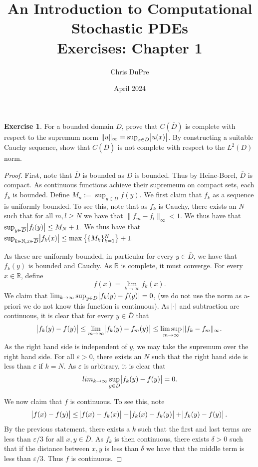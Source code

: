 \documentclass{amsart}
\title{An Introduction to Computational Stochastic PDEs\\ Exercises: Chapter 1}
\author{Chris DuPre }
\date{April 2024}
\theoremstyle{plain}
\theoremstyle{definition}
\newtheorem{exer}{Exercise}[section]
\newcommand{\R}{\mathbb{R}}
\newcommand{\N}{\mathbb{N}}
\begin{document}
\maketitle
\setcounter{section}{1}
\begin{exer}
For a bounded domain $D$, prove that $C\left(\overline{D}\right)$ is complete with respect to the supremum
norm $\|u\|_{\infty} = \sup_{x \in D} \abs{u(x)}$. By constructing a suitable Cauchy sequence, show that
$C\left(\overline{D}\right)$ is not complete with respect to the $L^{2}(D)$ norm. 
\end{exer}
\begin{proof}
    First, note that $\overline{D}$ is bounded as $D$ is bounded. Thus by Heine-Borel, $\overline{D}$ is compact. As continuous functions achieve their supremeum on compact sets, each $f_k$ is bounded. Define $M_n := \sup_{y\in \overline{D}} f(y)$. We first claim that $f_k$ as a sequence is uniformly bounded. To see this, note that as $f_k$ is Cauchy, there exists an $N$ such that for all $m,l\geq N$ we have that $\|f_m-f_l\|_{\infty} < 1.$ We thus have that $\sup_{y\in \overline{D}} \abs{f_l(y)} \leq M_N + 1.$ We thus have that $\sup_{k\in \N, x\in \overline{D}}\abs{f_k(x)} \leq \max\left\{\{M_k\}_{k=1}^{N}\right\}+1.$
    \par 
    As these are uniformly bounded, in particular for every $y\in \overline{D}$, we have that $f_k(y)$ is bounded and Cauchy. As $\R$ is complete, it must converge. For every $x\in \R$, define
    $$f(x) = \lim_{k\to \infty} f_k(x).$$
    We claim that $\lim_{k\to \infty} \sup_{y\in D} \abs{f_k(y)-f(y)} = 0$, (we do not use the norm as a-priori we do not know this function is continuous). As $\abs{\cdot}$ and subtraction are continuous, it is clear that for every $y \in \overline{D}$ that
    $$\abs{f_{k}(y)-f(y)} \leq\lim_{m\to \infty}\abs{f_{k}(y)-f_{m}(y)} \leq \limsup_{m\to \infty} \|f_k -f_m\|_{\infty}.$$
    As the right hand side is independent of $y$, we may take the supremum over the right hand side. For all $\varepsilon > 0$, there exists an $N$ such that the right hand side is less than $\varepsilon$ if $k=N$. As $\varepsilon$ is arbitrary, it is clear that 
    $$lim_{k\to \infty} \sup_{y\in D} \abs{f_k(y)-f(y)} = 0.$$
    \par We now claim that $f$ is continuous. To see this, note
    $$\abs{f(x)-f(y)}\leq \abs{f(x)-f_k(x)}+\abs{f_k(x)-f_k(y)}+\abs{f_k(y)-f(y)}.$$
    By the previous statement, there exists a $k$ such that the first and last terms are less than $\varepsilon/3$ for all $x,y\in\overline{D}.$ As $f_k$ is then continuous, there exists $\delta > 0$ such that if the distance between $x,y$ is less than $\delta$ we have that the middle term is less than $\varepsilon/3$. Thus $f$ is continuous.

\end{proof}
\end{document}
